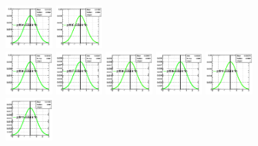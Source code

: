 \begin{figure}[!htbp]
{{\includegraphics[width=0.16\textwidth]{fig/posteriors__pdf34_BB18_fitBBBE161718_ADDGRW.png}
\includegraphics[width=0.16\textwidth]{fig/posteriors__pdf35_BB18_fitBBBE161718_ADDGRW.png}\\
\includegraphics[width=0.16\textwidth]{fig/posteriors__pdf36_BB18_fitBBBE161718_ADDGRW.png}
\includegraphics[width=0.16\textwidth]{fig/posteriors__pdf37_BB18_fitBBBE161718_ADDGRW.png}
\includegraphics[width=0.16\textwidth]{fig/posteriors__pdf38_BB18_fitBBBE161718_ADDGRW.png}
\includegraphics[width=0.16\textwidth]{fig/posteriors__pdf39_BB18_fitBBBE161718_ADDGRW.png}
\includegraphics[width=0.16\textwidth]{fig/posteriors__pdf40_BB18_fitBBBE161718_ADDGRW.png}\\
\includegraphics[width=0.16\textwidth]{fig/posteriors__pdf41_BB18_fitBBBE161718_ADDGRW.png}
}}
\end{figure}
